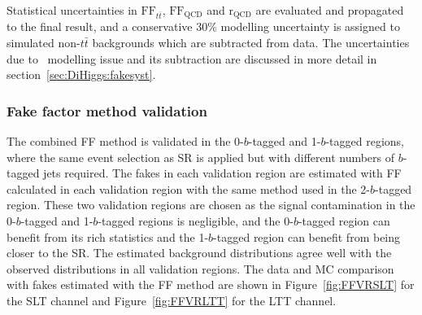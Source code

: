Statistical uncertainties in $\text{FF}_{t\bar{t}}$, $\text{FF}_\text{QCD}$ and $\mathrm{r}_\text{QCD}$
are evaluated and propagated to the final result,
and a conservative 30\% modelling uncertainty is assigned to simulated non-$t\bar t$ backgrounds
which are subtracted from data.
The uncertainties due to \ttbar\ modelling issue and its subtraction are discussed in more detail
in section~\ref{sec:DiHiggs:fakesyst}.

\newpage
\subsubsection{Fake factor method validation}
The combined FF method is validated in
the 0-$b$-tagged and 1-$b$-tagged regions, where the same event selection as SR 
is applied but with different numbers of $b$-tagged jets required. 
The fakes in each validation region are estimated with FF calculated in each validation region 
with the same method used in the 2-$b$-tagged region.
These two validation regions are chosen as 
the signal contamination in the 0-$b$-tagged 
and 1-$b$-tagged regions is negligible,
and the 0-$b$-tagged region can benefit from its rich statistics 
and the 1-$b$-tagged region can benefit from being closer to the SR.
The estimated background distributions agree well 
with the observed distributions in all validation regions.
The data and MC comparison with fakes estimated with the FF method 
are shown in Figure~\ref{fig:FFVRSLT} for the SLT channel and
Figure~\ref{fig:FFVRLTT} for the LTT channel. 

